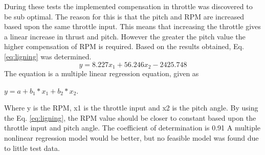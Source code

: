 During these tests the implemented compensation in throttle was discovered to be sub optimal. The reason for this is that the pitch and RPM are increased based upon the same throttle input. This means that increasing the throttle gives a linear increase in thrust and pitch. However the greater the pitch value the higher compensation of RPM is required. \bigskip
Based on the results obtained, Eq. \ref{eq:ligning} was determined.
\begin{equation}
\label{eq:ligning}
y = 8.227x_1 + 56.246x_2 -2425.748
\end{equation}\bigskip
The equation is a multiple linear regression equation, given as \begin{center}$y = a + b_1*x_1 + b_2*x_2$. \\ \end{center}
Where y is the RPM, x1 is the throttle input and x2 is the pitch angle. By using the Eq. \ref{eq:ligning}, the RPM value should be closer to constant based upon the throttle input and pitch angle. The coefficient of determination is 0.91 A multiple nonlinear regression model would be better, but no feasible model was found due to little test data. 





